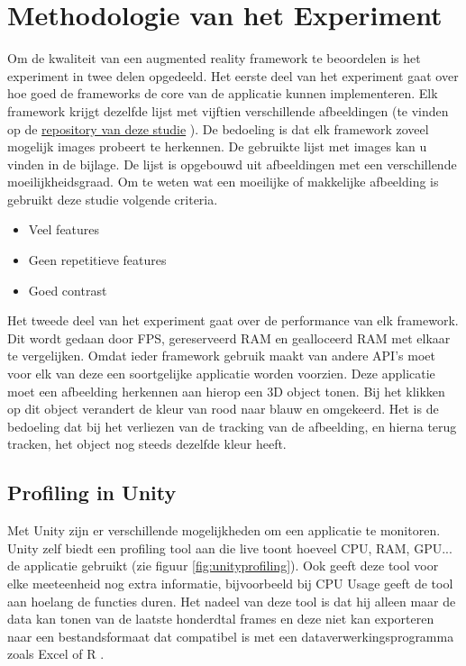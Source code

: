 
\chapter{Methodologie van het Experiment}
\label{ch:methodologie}

Om de kwaliteit van een augmented reality framework te beoordelen is het experiment in twee delen opgedeeld. Het eerste deel van het experiment gaat over hoe goed de frameworks de core van de applicatie kunnen implementeren. Elk framework krijgt dezelfde lijst met vijftien verschillende afbeeldingen (te vinden op de \href{https://github.com/MatthiasDeFre/bachelorproef-hogent-2019}{repository van deze studie} \autocite{GITHUBMDF}). De bedoeling is dat elk framework zoveel mogelijk images probeert te herkennen. De gebruikte lijst met images kan u vinden in de bijlage. De lijst is opgebouwd uit afbeeldingen met een verschillende moeilijkheidsgraad. Om te weten wat een moeilijke of makkelijke afbeelding is gebruikt deze studie volgende criteria.

\begin{itemize}
    \item Veel features
    \item Geen repetitieve features
    \item Goed contrast
\end{itemize} 


Het tweede deel van het experiment gaat over de performance van elk framework. Dit wordt gedaan door FPS, gereserveerd RAM en gealloceerd RAM met elkaar te vergelijken. Omdat ieder framework gebruik maakt van andere API's moet voor elk van deze een soortgelijke applicatie worden voorzien. Deze applicatie moet een afbeelding herkennen aan hierop een 3D object tonen. Bij het klikken op dit object verandert de kleur van rood naar blauw en omgekeerd. Het is de bedoeling dat bij het verliezen van de tracking van de afbeelding, en hierna terug tracken, het object nog steeds dezelfde kleur heeft.

\section{Profiling in Unity}
Met Unity zijn er verschillende mogelijkheden om een applicatie te monitoren. Unity zelf biedt een profiling tool aan die live toont hoeveel CPU, RAM, GPU... de applicatie gebruikt (zie figuur \ref{fig:unityprofiling}). Ook geeft deze tool voor elke meeteenheid nog extra informatie, bijvoorbeeld bij CPU Usage geeft de tool aan hoelang de functies duren. Het nadeel van deze tool is dat hij alleen maar de data kan tonen van de laatste honderdtal frames en deze niet kan exporteren naar een bestandsformaat dat compatibel is met een dataverwerkingsprogramma zoals Excel of R \autocite{UnityProfiling}.

